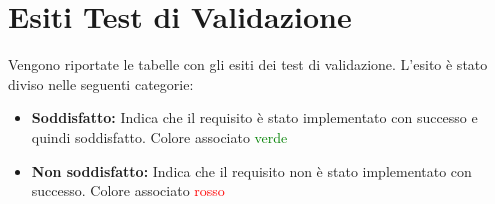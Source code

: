 \section{Esiti Test di Validazione}

Vengono riportate le tabelle con gli esiti dei test di validazione. L'esito è stato diviso nelle seguenti categorie:
\begin{itemize}
\item \textbf{Soddisfatto:} Indica che il requisito è stato implementato con successo e quindi
soddisfatto. Colore associato \textcolor{green}{verde}
\item \textbf{Non soddisfatto:} Indica che il requisito non è stato implementato con successo.
Colore associato \textcolor{red}{rosso}
\end{itemize}

